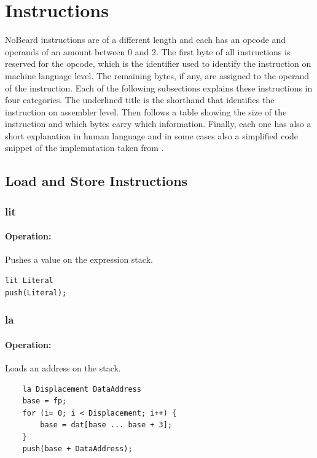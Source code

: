 \section{Instructions}\label{sec:instructions}
NoBeard instructions are of a different length and each has an opcode and operands of an amount between 0 and 2. The first byte of all instructions is reserved for the opcode, which is the identifier used to identify the instruction on machine language level. The remaining bytes, if any, are assigned to the operand of the instruction.
Each of the following subsections explains these instructions in four categories. The underlined title is the shorthand that identifies the instruction on assembler level. Then follows a table showing the size of the instruction and which bytes carry which information. Finally, each one has also a short explanation in human language and in some cases also a simplified code snippet of the implemntation taken from \cite{bauer_p._2017}.

\subsection{Load and Store Instructions}
\subsubsection{lit}

\paragraph{Operation:}
Pushes a value on the expression stack.

\begin{lstlisting}
lit Literal
push(Literal);
\end{lstlisting}


\subsubsection{la}

\paragraph{Operation:}
Loads an address on the stack.

	\begin{lstlisting}
	la Displacement DataAddress
	base = fp;
	for (i= 0; i < Displacement; i++) {
		base = dat[base ... base + 3];
	}
	push(base + DataAddress);
	\end{lstlisting}

